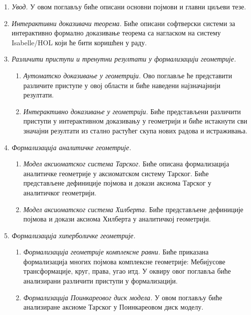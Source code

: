\documentclass[11pt]{article}
\newcommand{\lat}{}
\begin{document}
\begin{enumerate}
\item \emph{Увод.} У овом поглављу биће описани основни појмови и
  главни циљеви тезе.

\item \emph{Интерактивни доказивачи теорема.} Биће описани
  софтверски системи за интерактивно формално доказивање теорема са
  нагласком на систему {\lat Isabelle/HOL} који ће бити ко\-ри\-шћен у
  раду.
      
\item \emph{Различити приступи и тренутни резултати у формализацији геометрије.}
  \begin{enumerate}[label*=\arabic*.]
      \item {\em Аутоматско доказивање у геометрији.} Ово поглавље ће
        представити различите приступе у овој области и биће наведени
        најзначајнији резултати.
      \item {\em Интерактивно доказивање у геометрији.}  Биће
        представљени различити приступи у интерактивном доказивању у
        геометрији и биће истакнути сви значајни резултати из стално
        растућег скупа нових радова и истраживања.
      \end{enumerate}

\item \emph{Формализација аналитичке геометрије.}
      \begin{enumerate}[label*=\arabic*.]
      \item {\em Модел аксиоматског система Тарског.} Биће описана формализација аналитичке
        геометрије у аксиоматском систему Тарског. Биће представљене дефиниције
        појмова и докази аксиома Тарског у аналитичког геометрији.
      \item {\em Модел аксиоматског система Хилберта.} Биће представљене дефиниције појмова
        и докази аксиома Хилберта у аналитичкој геометрији.
      \end{enumerate}
      
\item \emph{Формализација хиперболичке геометрије.}
      \begin{enumerate}[label*=\arabic*.]
      \item {\em Формализација геометрије комплексне равни.} Биће
        приказана формализација мно\-гих појмова комплексне геометрије:
        Мебијусове трансформације, круг, права, угао итд. У оквиру
        овог поглавља биће анализирани различити приступи у
        формали\-за\-ци\-ји.
      \item {\em Формализација Поинкареовог диск модела.} У овом
        поглављу биће анализиране аксиоме Тарског у Поинкареовом диск
        моделу.
      \end{enumerate}


\end{enumerate}
\end{document}

